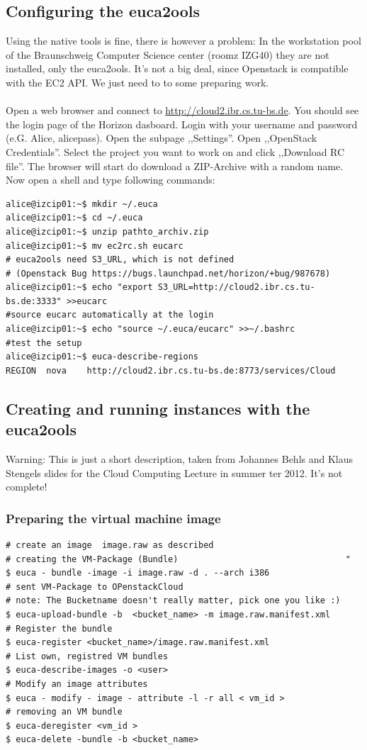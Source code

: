 \documentclass[a4paper,bibtotoc,english,liststotoc]{scrartcl}
\begin{document}
\subsection{Configuring the euca2ools}
\label{sec:conf-euca2}
Using the native tools is fine, there is however a problem: In the
workstation pool of the Braunschweig Computer Science center (roomz
IZG40) they are not installed, only the euca2ools. It's not a big
deal, since Openstack is compatible with the EC2 API. We just need to
to some preparing work.\\\\
Open a web browser and connect to
\url{http://cloud2.ibr.cs.tu-bs.de}. You should see the login page of
the Horizon dasboard. Login with your username and password
(e.G. Alice, alicepass). Open the subpage ,,Settings''. Open
,,OpenStack Credentials''. Select the project you want to work on and
click ,,Download RC file''. The browser will start do download a
ZIP-Archive with a random name. Now open a shell and type following
commands:
\begin{verbatim}
alice@izcip01:~$ mkdir ~/.euca
alice@izcip01:~$ cd ~/.euca
alice@izcip01:~$ unzip pathto_archiv.zip
alice@izcip01:~$ mv ec2rc.sh eucarc
# euca2ools need S3_URL, which is not defined 
# (Openstack Bug https://bugs.launchpad.net/horizon/+bug/987678)
alice@izcip01:~$ echo "export S3_URL=http://cloud2.ibr.cs.tu-bs.de:3333" >>eucarc
#source eucarc automatically at the login
alice@izcip01:~$ echo "source ~/.euca/eucarc" >>~/.bashrc
#test the setup
alice@izcip01:~$ euca-describe-regions
REGION  nova    http://cloud2.ibr.cs.tu-bs.de:8773/services/Cloud
\end{verbatim}

\subsection{Creating and running instances with the euca2ools}
\label{sec:creat-runn-inst-ec2}
Warning: This is just a short description, taken from Johannes Behls
and Klaus Stengels slides for the Cloud Computing Lecture in summer
ter 2012. It's not complete!

\subsubsection{Preparing the virtual machine image}
\label{sec:prep-virt-mach}


\begin{verbatim}
# create an image  image.raw as described 
# creating the VM-Package (Bundle)                                 "
$ euca - bundle -image -i image.raw -d . --arch i386
# sent VM-Package to OPenstackCloud
# note: The Bucketname doesn't really matter, pick one you like :)
$ euca-upload-bundle -b  <bucket_name> -m image.raw.manifest.xml
# Register the bundle
$ euca-register <bucket_name>/image.raw.manifest.xml 
# List own, registred VM bundles
$ euca-describe-images -o <user>
# Modify an image attributes 
$ euca - modify - image - attribute -l -r all < vm_id >
# removing an VM bundle
$ euca-deregister <vm_id >
$ euca-delete -bundle -b <bucket_name>
\end{verbatim}
\end{document}
